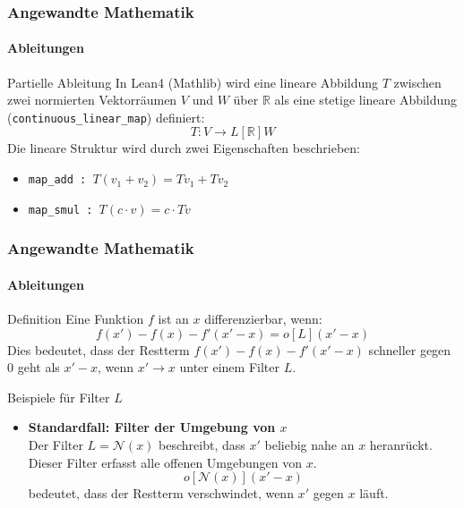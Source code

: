 \documentclass{beamer}
\begin{document}
    \begin{frame}
        \frametitle{Angewandte Mathematik}
        \framesubtitle{Ableitungen}
        \begin{block}{Partielle Ableitung}
            In Lean4 (Mathlib) wird eine lineare Abbildung \( T \) zwischen zwei normierten Vektorräumen \( V \) und \( W \) über \( \mathbb{R} \) als eine stetige lineare Abbildung (\texttt{continuous\_linear\_map}) definiert:
            \[
            T : V \to L[\mathbb{R}] W
            \]
            Die lineare Struktur wird durch zwei Eigenschaften beschrieben:
            \begin{itemize}
                \item \texttt{map\_add : $T (v_1 + v_2) = T v_1 + T v_2$}
                \item \texttt{map\_smul : $T (c \cdot v) = c \cdot T v$}
            \end{itemize}
        \end{block}
    
    \end{frame}


\begin{frame}
    \frametitle{Angewandte Mathematik}
    \framesubtitle{Ableitungen}

\begin{block}{Definition}
  Eine Funktion \( f \) ist an \( x \) differenzierbar, wenn:
  \[
  f(x') - f(x) - f'(x' - x) = o[L](x' - x)
  \]
  Dies bedeutet, dass der Restterm \( f(x') - f(x) - f'(x' - x) \) schneller gegen 0 geht als \( x' - x \), wenn \( x' \to x \) unter einem Filter \( L \).
\end{block}

\begin{block}{Beispiele für Filter \( L \)}
  \begin{itemize}
    \item \textbf{Standardfall: Filter der Umgebung von \( x \)} \\
    Der Filter \( L = \mathcal{N}(x) \) beschreibt, dass \( x' \) beliebig nahe an \( x \) heranrückt. Dieser Filter erfasst alle offenen Umgebungen von \( x \). 
    \[
    o[{\mathcal{N}(x)}](x' - x)
    \]
    bedeutet, dass der Restterm verschwindet, wenn \( x' \) gegen \( x \) läuft.
  \end{itemize}
\end{block}
\end{frame}
\end{document}
